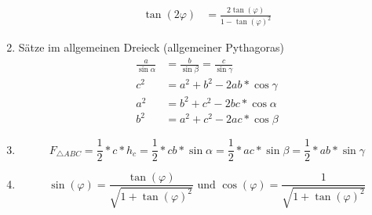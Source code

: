 \documentclass[a4paper,10pt]{article}
\begin{document}
\begin{enumerate}
\begin{align}
	\tan{(2 \varphi)} &= \frac{2\tan{(\varphi)}}{1-\tan{(\varphi)}^2} \tag{Doppelwinkel3}
	\end{align}
\item Sätze im allgemeinen Dreieck (allgemeiner Pythagoras)
	\begin{align}
	\frac{a}{\sin{\alpha}} &= \frac{b}{\sin{\beta}} = \frac{c}{\sin{\gamma}} \tag{Sinussatz}\\
	c^2 &= a^2 + b^2 - 2ab * \cos{\gamma} \tag{Cosinussatz1}\\
	a^2 &= b^2 + c^2 - 2bc * \cos{\alpha} \tag{Cosinussatz2}\\
	b^2 &= a^2 + c^2 - 2ac * \cos{\beta} \tag{Cosinussatz3}
	\end{align}
\item \[F_{\triangle ABC} = \frac{1}{2} * c * h_c = \frac{1}{2} * cb * \sin{\alpha} = \frac{1}{2} * ac * \sin{\beta} = \frac{1}{2} * ab * \sin{\gamma}\]
\item \[\sin{(\varphi)} = \frac{\tan{(\varphi)}}{\sqrt{1+\tan{(\varphi)}^2}} \text{ und } \cos{(\varphi)} = \frac{1}{\sqrt{1+\tan{(\varphi)}^2}}\]
\end{enumerate}

\end{document}
